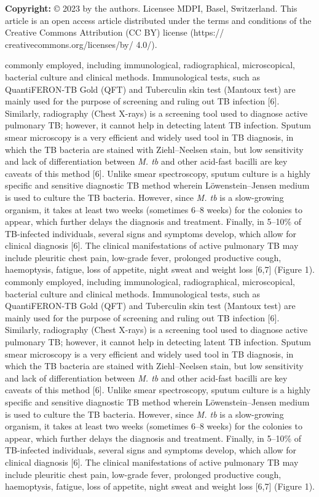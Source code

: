 \documentclass{article}
\begin{document}
\textbf{Copyright:} © 2023 by the authors. Licensee MDPI, Basel, Switzerland. This article is an open access article distributed under the terms and conditions of the Creative Commons Attribution (CC BY) license (https:// creativecommons.org/licenses/by/ 4.0/).

commonly employed, including immunological, radiographical, microscopical, bacterial culture and clinical methods. Immunological tests, such as QuantiFERON-TB Gold (QFT) and Tuberculin skin test (Mantoux test) are mainly used for the purpose of screening and ruling out TB infection [6]. Similarly, radiography (Chest X-rays) is a screening tool used to diagnose active pulmonary TB; however, it cannot help in detecting latent TB infection. Sputum smear microscopy is a very efficient and widely used tool in TB diagnosis, in which the TB bacteria are stained with Ziehl–Neelsen stain, but low sensitivity and lack of differentiation between \textit{M. tb} and other acid-fast bacilli are key caveats of this method [6]. Unlike smear spectroscopy, sputum culture is a highly specific and sensitive diagnostic TB method wherein Löwenstein–Jensen medium is used to culture the TB bacteria. However, since \textit{M. tb} is a slow-growing organism, it takes at least two weeks (sometimes 6–8 weeks) for the colonies to appear, which further delays the diagnosis and treatment. Finally, in 5–10\% of TB-infected individuals, several signs and symptoms develop, which allow for clinical diagnosis [6]. The clinical manifestations of active pulmonary TB may include pleuritic chest pain, low-grade fever, prolonged productive cough, haemoptysis, fatigue, loss of appetite, night sweat and weight loss [6,7] (Figure 1). commonly employed, including immunological, radiographical, microscopical, bacterial culture and clinical methods. Immunological tests, such as QuantiFERON-TB Gold (QFT) and Tuberculin skin test (Mantoux test) are mainly used for the purpose of screening and ruling out TB infection [6]. Similarly, radiography (Chest X-rays) is a screening tool used to diagnose active pulmonary TB; however, it cannot help in detecting latent TB infection. Sputum smear microscopy is a very efficient and widely used tool in TB diagnosis, in which the TB bacteria are stained with Ziehl–Neelsen stain, but low sensitivity and lack of differentiation between \textit{M. tb} and other acid-fast bacilli are key caveats of this method [6]. Unlike smear spectroscopy, sputum culture is a highly specific and sensitive diagnostic TB method wherein Löwenstein–Jensen medium is used to culture the TB bacteria. However, since \textit{M. tb} is a slow-growing organism, it takes at least two weeks (sometimes 6–8 weeks) for the colonies to appear, which further delays the diagnosis and treatment. Finally, in 5–10\% of TB-infected individuals, several signs and symptoms develop, which allow for clinical diagnosis [6]. The clinical manifestations of active pulmonary TB may include pleuritic chest pain, low-grade fever, prolonged productive cough, haemoptysis, fatigue, loss of appetite, night sweat and weight loss [6,7] (Figure 1).
\end{document}
